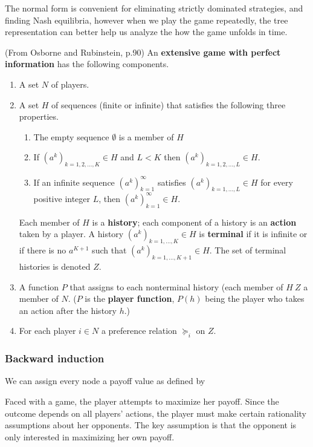 The normal form is convenient for eliminating strictly dominated strategies, and finding Nash equilibria, however when we play the game repeatedly, the tree representation can better help us analyze the how the game unfolds in time.

\begin{definition} (From Osborne and Rubinstein, p.90) An \textbf{extensive game with perfect information} has the following components.
\begin{enumerate}
\item A set $N$ of players.
\item A set $H$ of sequences (finite or infinite) that satisfies the following three properties.
	\begin{enumerate}
	\item The empty sequence $\emptyset$ is a member of $H$
	\item If $(a^k)_{k=1,2,\dots,K} \in H$ and $L < K$ then $(a^k)_{k=1,2,\dots,L} \in H$.
	\item If an infinite sequence $(a^k)_{k=1}^\infty$ satisfies $(a^k)_{k=1,\dots,L} \in H$ for every positive integer $L$, then $(a^k)_{k=1}^\infty \in H$.
	\end{enumerate}
	Each member of $H$ is a \textbf{history}; each component of a history is an \textbf{action} taken by a player. A history $(a^k)_{k=1,\dots,K} \in H$ is \textbf{terminal} if it is infinite or if there is no $a^{K+1}$ such that $(a^k)_{k=1,\dots,K+1} \in H$. The set of terminal histories is denoted $Z$.
\item A function $P$ that assigns to each nonterminal history (each member of $H \ Z$ a member of $N$. ($P$ is the \textbf{player function}, $P(h)$ being the player who takes an action after the history $h$.)
\item For each player $i \in N$ a preference relation $\succeq_i$ on $Z$.
\end{enumerate}
\end{definition}

\subsubsection {Backward induction}
We can assign every node a payoff value as defined by 


Faced with a game, the player attempts to maximize her payoff. Since the outcome depends on all players' actions, the player must make certain rationality assumptions about her opponents. The key assumption is that the opponent is only interested in maximizing her own payoff.





